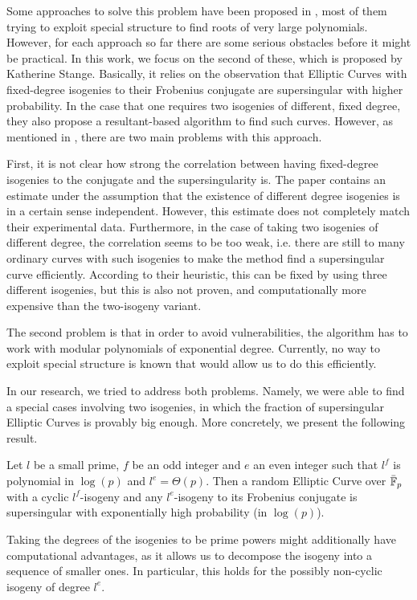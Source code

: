 Some approaches to solve this problem have been proposed in \cite{base_paper}, most of them trying to exploit special structure to find roots of very large polynomials.
However, for each approach so far there are some serious obstacles before it might be practical.
In this work, we focus on the second of these, which is proposed by Katherine Stange.
Basically, it relies on the observation that Elliptic Curves with fixed-degree isogenies to their Frobenius conjugate are supersingular with higher probability.
In the case that one requires two isogenies of different, fixed degree, they also propose a resultant-based algorithm to find such curves.
However, as mentioned in \cite{base_paper}, there are two main problems with this approach.

First, it is not clear how strong the correlation between having fixed-degree isogenies to the conjugate and the supersingularity is.
The paper contains an estimate under the assumption that the existence of different degree isogenies is in a certain sense independent.
However, this estimate does not completely match their experimental data.
Furthermore, in the case of taking two isogenies of different degree, the correlation seems to be too weak, i.e. there are still to many ordinary curves with such isogenies to make the method find a supersingular curve efficiently.
According to their heuristic, this can be fixed by using three different isogenies, but this is also not proven, and computationally more expensive than the two-isogeny variant.

The second problem is that in order to avoid vulnerabilities, the algorithm has to work with modular polynomials of exponential degree.
Currently, no way to exploit special structure is known that would allow us to do this efficiently.

In our research, we tried to address both problems.
Namely, we were able to find a special cases involving two isogenies, in which the fraction of supersingular Elliptic Curves is provably big enough.
More concretely, we present the following result.
\begin{prop}
    Let $l$ be a small prime, $f$ be an odd integer and $e$ an even integer such that $l^f$ is polynomial in $\log(p)$ and $l^e = \Theta(p)$.
    Then a random Elliptic Curve over $\bar{\mathbb{F}}_p$ with a cyclic $l^f$-isogeny and any $l^e$-isogeny to its Frobenius conjugate is supersingular with exponentially high probability (in $\log(p)$).
\end{prop}
Taking the degrees of the isogenies to be prime powers might additionally have computational advantages, as it allows us to decompose the isogeny into a sequence of smaller ones.
In particular, this holds for the possibly non-cyclic isogeny of degree $l^e$.

